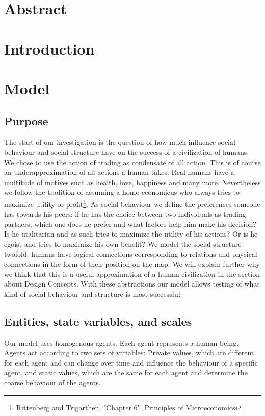 \documentclass{JASSS}
\begin{document}

\section{Abstract}

\section{Introduction}

\section{Model}
\subsection{Purpose}
The start of our investigation is the question of how much influence social behaviour and social structure have on the success of a civilization of humans. We chose to use the action of trading as condensate of all action. This is of course an underapproximation of all actions a human takes. Real humans have a multitude of motives such as health, love, happiness and many more. Nevertheless we follow the tradition of assuming a homo economicus who always tries to maximize utility or profit\footnote{Rittenberg and Trigarthen. "Chapter 6". Principles of Microeconomics}. As social behaviour we define the preferences someone has towards his peers: if he has the choice between two individuals as trading partners, which one does he prefer and what factors help him make his decision? Is he utalitarian and as such tries to maximize the utility of his actions? Or is he egoist and tries to maximize his own benefit? We model the social structure twofold: humans have logical connections corresponding to relations and physical connections in the form of their position on the map. We will explain further why we think that this is a useful approximation of a human civilization in the section about Design Concepts. With these abstractions our model allows testing of what kind of social behaviour and structure is most successful.


\subsection{Entities, state variables, and scales}
Our model uses homogenous agents. Each agent represents a human being. Agents act according to two sets of variables: Private values, which are different for each agent and can change over time and influence the behaviour of a specific agent, and static values, which are the same for each agent and determine the coarse behaviour of the agents.\\
\end{document}
